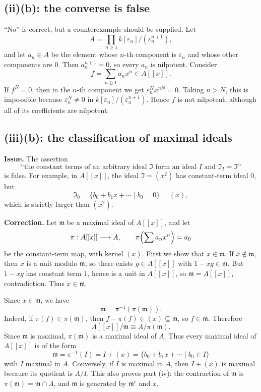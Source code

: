 \documentclass[11pt]{article}
\newcommand{\fm}{\mathfrak m}
\begin{document}
\subsection*{(ii)(b): the converse is false}
``No'' is correct, but a counterexample should be supplied.  Let
\[
A=\prod_{n\ge1}k[\varepsilon_n]/(\varepsilon_n^{n+1}),
\]
and let \(a_n\in A\) be the element whose \(n\)-th component is
\(\varepsilon_n\) and whose other components are \(0\).  Then
\(a_n^{n+1}=0\), so every \(a_n\) is nilpotent.  Consider
\[
f=\sum_{n\ge1}a_nx^n\in A[[x]].
\]
If \(f^N=0\), then in the \(n\)-th component we get
\(\varepsilon_n^N x^{nN}=0\).  Taking \(n>N\), this is impossible because
\(\varepsilon_n^N\neq0\) in \(k[\varepsilon_n]/(\varepsilon_n^{n+1})\).
Hence \(f\) is not nilpotent, although all of its coefficients are nilpotent.

\subsection*{(iii)(b): the classification of maximal ideals}

\textbf{Issue.}  The assertion
\[
\text{``the constant terms of an arbitrary ideal }\mathfrak I
\text{ form an ideal }I\text{ and }\mathfrak I_I=\mathfrak I\text{''}
\]
is false.  For example, in \(A[[x]]\), the ideal \(\mathfrak I=(x^2)\) has
constant-term ideal \(0\), but
\[
\mathfrak I_0=\{b_0+b_1x+\cdots\mid b_0=0\}=(x),
\]
which is strictly larger than \((x^2)\).

\textbf{Correction.}  Let \(\fm\) be a maximal ideal of \(A[[x]]\), and let
\[
\pi:A[[x]]\longrightarrow A,\qquad \pi\Bigl(\sum a_nx^n\Bigr)=a_0
\]
be the constant-term map, with kernel \((x)\).  First we show that
\(x\in\fm\).  If \(x\notin\fm\), then \(x\) is a unit modulo \(\fm\), so there
exists \(g\in A[[x]]\) with \(1-xg\in\fm\).  But \(1-xg\) has constant term
\(1\), hence is a unit in \(A[[x]]\), so \(\fm=A[[x]]\), contradiction.
Thus \(x\in\fm\).

Since \(x\in\fm\), we have
\[
\fm=\pi^{-1}(\pi(\fm)).
\]
Indeed, if \(\pi(f)\in\pi(\fm)\), then \(f-\pi(f)\in(x)\subseteq\fm\), so
\(f\in\fm\).  Therefore
\[
A[[x]]/\fm\cong A/\pi(\fm).
\]
Since \(\fm\) is maximal, \(\pi(\fm)\) is a maximal ideal of \(A\).  Thus every
maximal ideal of \(A[[x]]\) is of the form
\[
\fm=\pi^{-1}(I)=I+(x)
=\{b_0+b_1x+\cdots\mid b_0\in I\}
\]
with \(I\) maximal in \(A\).  Conversely, if \(I\) is maximal in \(A\), then
\(I+(x)\) is maximal because its quotient is \(A/I\).  This also proves
part (iv): the contraction of \(\fm\) is \(\pi(\fm)=\fm\cap A\), and \(\fm\)
is generated by \(\fm^c\) and \(x\).
\end{document}
